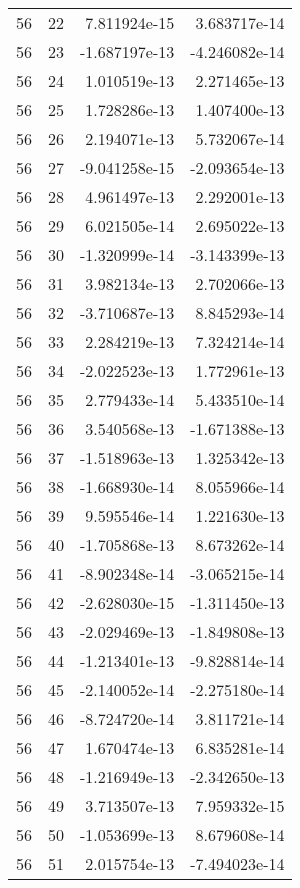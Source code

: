 \begin{tabular}{rrrr}
  56 &   22 &  7.811924e-15 &  3.683717e-14 \\
  56 &   23 & -1.687197e-13 & -4.246082e-14 \\
  56 &   24 &  1.010519e-13 &  2.271465e-13 \\
  56 &   25 &  1.728286e-13 &  1.407400e-13 \\
  56 &   26 &  2.194071e-13 &  5.732067e-14 \\
  56 &   27 & -9.041258e-15 & -2.093654e-13 \\
  56 &   28 &  4.961497e-13 &  2.292001e-13 \\
  56 &   29 &  6.021505e-14 &  2.695022e-13 \\
  56 &   30 & -1.320999e-14 & -3.143399e-13 \\
  56 &   31 &  3.982134e-13 &  2.702066e-13 \\
  56 &   32 & -3.710687e-13 &  8.845293e-14 \\
  56 &   33 &  2.284219e-13 &  7.324214e-14 \\
  56 &   34 & -2.022523e-13 &  1.772961e-13 \\
  56 &   35 &  2.779433e-14 &  5.433510e-14 \\
  56 &   36 &  3.540568e-13 & -1.671388e-13 \\
  56 &   37 & -1.518963e-13 &  1.325342e-13 \\
  56 &   38 & -1.668930e-14 &  8.055966e-14 \\
  56 &   39 &  9.595546e-14 &  1.221630e-13 \\
  56 &   40 & -1.705868e-13 &  8.673262e-14 \\
  56 &   41 & -8.902348e-14 & -3.065215e-14 \\
  56 &   42 & -2.628030e-15 & -1.311450e-13 \\
  56 &   43 & -2.029469e-13 & -1.849808e-13 \\
  56 &   44 & -1.213401e-13 & -9.828814e-14 \\
  56 &   45 & -2.140052e-14 & -2.275180e-14 \\
  56 &   46 & -8.724720e-14 &  3.811721e-14 \\
  56 &   47 &  1.670474e-13 &  6.835281e-14 \\
  56 &   48 & -1.216949e-13 & -2.342650e-13 \\
  56 &   49 &  3.713507e-13 &  7.959332e-15 \\
  56 &   50 & -1.053699e-13 &  8.679608e-14 \\
  56 &   51 &  2.015754e-13 & -7.494023e-14 \\

\end{tabular}
